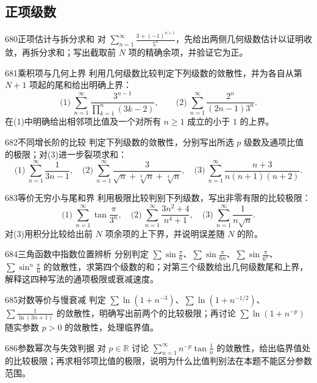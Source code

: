 \subsection{正项级数}
\begin{exercise}{680}{正项估计与拆分求和}
对 $\sum_{n=1}^{\infty}\frac{3+(-1)^{n+1}}{5^n}$，先给出两侧几何级数估计以证明收敛，再拆分求和；写出截取前 $N$ 项的精确余项，并验证它为正。
\end{exercise}
\begin{exercise}{681}{乘积项与几何上界}
利用几何级数比较判定下列级数的敛散性，并为各自从第 $N+1$ 项起的尾和给出明确上界：
\[\text{(1)}\ \sum_{n=1}^{\infty}\frac{3^{n-1}}{\prod_{k=1}^{n}(3k-2)},\qquad
\text{(2)}\ \sum_{n=1}^{\infty}\frac{2^n}{(2n-1)3^n}.\]
在(1)中明确给出相邻项比值及一个对所有 $n\ge1$ 成立的小于 $1$ 的上界。
\end{exercise}
\begin{exercise}{682}{不同增长阶的比较}
判定下列级数的敛散性，分别写出所选 $p$ 级数及通项比值的极限；对(3)进一步裂项求和：
\[\text{(1)}\ \sum_{n=1}^{\infty}\frac1{3n-1},\quad
\text{(2)}\ \sum_{n=1}^{\infty}\frac3{\sqrt n+\sqrt[3]n+\sqrt[4]n},\quad
\text{(3)}\ \sum_{n=1}^{\infty}\frac{n+3}{n(n+1)(n+2)}.\]
\end{exercise}
\begin{exercise}{683}{等价无穷小与尾和界}
利用极限比较判别下列级数，写出非零有限的比较极限：
\[\text{(1)}\ \sum_{n=1}^{\infty}\tan\frac\pi{3^n},\quad
\text{(2)}\ \sum_{n=1}^{\infty}\frac{3n^2+4}{n^4+1},\quad
\text{(3)}\ \sum_{n=1}^{\infty}\frac1{n\sqrt n}.\]
对(3)用积分比较给出前 $N$ 项余项的上下界，并说明误差随 $N$ 的阶。
\end{exercise}
\begin{exercise}{684}{三角函数中指数位置辨析}
分别判定 $\sum\sin\frac\pi6$、$\sum\sin\frac\pi{6n}$、$\sum\sin\frac\pi{6^n}$、$\sum\sin^n\frac\pi6$ 的敛散性，求第四个级数的和；对第三个级数给出几何级数尾和上界，解释这四种写法的通项极限或衰减速度。
\end{exercise}
\begin{exercise}{685}{对数等价与慢衰减}
判定 $\sum\ln(1+n^{-3})$、$\sum\ln(1+n^{-1/2})$、$\sum\frac1{\ln(3n+1)}$ 的敛散性，明确写出前两个的比较极限；再讨论 $\sum\ln(1+n^{-p})$ 随实参数 $p>0$ 的敛散性，处理临界值。
\end{exercise}
\begin{exercise}{686}{参数幂次与失效判据}
对 $p\in\mathbb R$ 讨论 $\sum_{n=1}^{\infty}n^{-p}\tan\frac1n$ 的敛散性，给出临界值处的比较极限；再求相邻项比值的极限，说明为什么比值判别法在本题不能区分参数范围。
\end{exercise}
